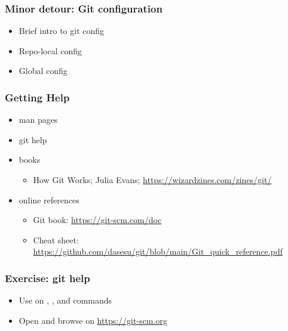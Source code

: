 \documentclass{git_course}
\begin{document}
\begin{frame}
\frametitle{Minor detour: Git configuration}
\begin{itemize}
    \item Brief intro to git config
    \item Repo-local config
    \item Global config
\end{itemize}
\end{frame}

\begin{frame}
\frametitle{Getting Help}
\begin{itemize}
    \item man pages
    \item git help
    \item books
    \begin{itemize}
        \item How Git Works; Julia Evans; \url{https://wizardzines.com/zines/git/}
    \end{itemize}
    \item online references
    \begin{itemize}
        \item Git book: \url{https://git-scm.com/doc}
        \item Cheat sheet: \url{https://github.com/dasesu/git/blob/main/Git_quick_reference.pdf}
    \end{itemize}
\end{itemize}
\end{frame}

\begin{frame}
\frametitle{Exercise: git help}
\begin{itemize}
    \item Use  on , ,  and
         commands
    \item Open and browse on \url{https://git-scm.org}
\end{itemize}
\end{frame}
\end{document}
